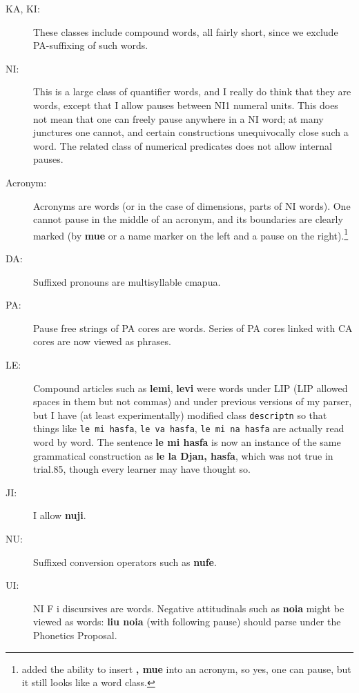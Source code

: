 \documentclass[12pt]{book}
\begin{document}
{\begin{description}
\item[KA, KI:]  These classes include compound words, all fairly short, since we exclude PA-suffixing of such words.

\item[NI:]  This is a large class of quantifier words, and I really do think that they are words, except that I allow pauses
between NI1  numeral units.  This does not mean that one can freely pause anywhere in a NI word; at many junctures one cannot,
and certain constructions unequivocally close such a word.  The related class of numerical predicates does not allow internal pauses.

\item[Acronym:]  Acronyms are words (or in the case of dimensions, parts of NI words).  One cannot pause in the middle of an acronym,
and its boundaries are clearly marked (by {\bf mue} or a name marker on the left and a pause on the right).\footnote{added the ability to insert {\bf , mue} into an acronym, so yes, one can pause, but it still looks like a word class.}

\item[DA:]  Suffixed pronouns are multisyllable cmapua.

\item[PA:]  Pause free strings of PA cores are words.  Series of PA cores  linked with CA cores are now viewed as phrases.

\item[LE:]  Compound articles such as {\bf lemi}, {\bf levi} were words under LIP (LIP allowed spaces in them but not commas) and under previous versions of my parser,
but I have (at least experimentally) modified class {\tt descriptn} so that things like {\tt le mi hasfa}, {\tt le va hasfa}, {\tt le mi na hasfa} are actually read word by word.
The sentence {\bf le mi hasfa} is now an instance of the same grammatical construction as {\bf le la Djan, hasfa}, which was not true in trial.85, though every learner may have thought so.

\item[JI:]  I allow {\bf nuji}.

\item[NU:]  Suffixed conversion operators such as {\bf nufe}.

\item[UI:]  NI F i discursives are words.  Negative attitudinals such as {\bf noia} might be viewed as words:  {\bf liu noia} (with following pause) should parse under the Phonetics Proposal.


\end{description}}
\end{document}
